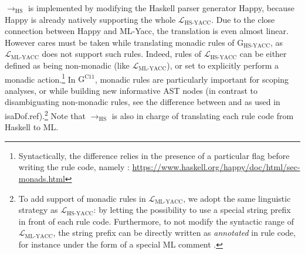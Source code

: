 \begin{isabellebody}
\begin{isamarkuptext}
$\longrightarrow_{\text{HS}}$ is implemented by modifying the Haskell parser generator Happy,
because Happy is already natively supporting the whole $\mathcal{L}_{\text{HS-YACC}}$. Due to the
close connection between Happy and ML-Yacc, the translation is even almost linear. However cares
must be taken while translating monadic rules of $\text{G}_{\text{HS-YACC}}$, as
$\mathcal{L}_{\text{ML-YACC}}$ does not support such rules. Indeed, rules of
$\mathcal{L}_{\text{HS-YACC}}$ can be either defined as being non-monadic (like
$\mathcal{L}_{\text{ML-YACC}}$), or set to explicitly perform a monadic action.\footnote{Syntactically, the difference relies in the presence of a particular flag before writing
  the rule code, namely :
  \url{https://www.haskell.org/happy/doc/html/sec-monads.html}} In
$\text{G}^{\text{C11}}$, monadic rules are particularly important for scoping analyses, or while
building new informative AST nodes (in contrast to disambiguating non-monadic rules, see the
difference between \isa{{\isacharat}} and \isa{{\isacharampersand}} as used in
\csname isaDof.ref).\footnote{To add support of monadic rules in
  $\mathcal{L}_{\text{ML-YACC}}$, we adopt the same linguistic strategy as
  $\mathcal{L}_{\text{HS-YACC}}$: by letting the possibility to use a special string prefix in front
  of each rule code. Furthermore, to not modify the syntactic range of
  $\mathcal{L}_{\text{ML-YACC}}$, the string prefix can be directly written as
  \emph{annotated} in rule code, for instance under the form of a special ML comment
  .} Note that $\longrightarrow_{\text{HS}}$ is also in charge of
translating each rule code from Haskell to ML.


\end{isamarkuptext}
\end{isabellebody}
